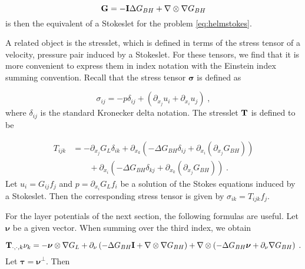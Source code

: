 \documentclass[preprint,12pt]{article}
\def\GG{{\bf G}}
\def\II{{\bf I}}
\def\TT{{\bf T}}
\def\bsigma{{\boldsymbol \sigma}}
\def\bnu{{\boldsymbol \nu}}
\def\btau{{\boldsymbol \tau}}
\begin{document}
\begin{equation}
  \GG = - \II \Delta G_{BH} + \nabla \otimes \nabla G_{BH}
\end{equation}
is then the equivalent of a Stokeslet
\cite{pozrikidis1992boundary} for the problem
\eqref{eq:helmstokes}.

A related object is the stresslet, which is defined
in terms of the stress tensor of a velocity, pressure
pair induced by a Stokeslet. For these tensors, we find
that it is more convenient to express them in index notation
with the Einstein index summing convention.
Recall that the stress tensor $\bsigma$ is defined as 

\begin{equation}
  \sigma_{ij} = -p \delta_{ij} + \left ( \partial_{x_j}u_i
  +\partial_{x_i} u_j \right ) \; ,
\end{equation}
where $\delta_{ij}$ is the standard Kronecker delta notation.
The stresslet $\TT$ is defined to be

\begin{align}
  T_{ijk} &= - \partial_{x_j} G_L \delta_{ik}
  + \partial_{x_k} \left ( -\Delta G_{BH} \delta_{ij} +
  \partial_{x_i} \left(\partial_{x_j} G_{BH} \right) \right)
  \nonumber \\
  & \qquad+ \partial_{x_i} \left ( -\Delta G_{BH} \delta_{kj} +
  \partial_{x_k} \left(\partial_{x_j} G_{BH} \right) \right)
  \; .
\end{align}
Let $u_i = G_{ij} f_j$ and $p = \partial_{x_i} G_L f_i$ be a
solution of the Stokes equations induced by a Stokeslet.
Then the corresponding stress tensor is given by
$\sigma_{ik} = T_{ijk} f_j$.

For the layer potentials of the next section, the following
formulas are useful. Let $\bnu$ be a given vector. When
summing over the third index, we obtain

\begin{equation}
  \TT_{\cdot,\cdot,k} \nu_k = -\bnu \otimes \nabla G_L
  + \partial_\nu \left ( -\Delta G_{BH} \II
  + \nabla \otimes \nabla G_{BH} \right)
  + \nabla \otimes \left ( -\Delta G_{BH} \bnu
  + \partial_{\nu} \nabla G_{BH} \right) \; .
\end{equation}
Let $\btau = \bnu^\bot$. Then
\end{document}
